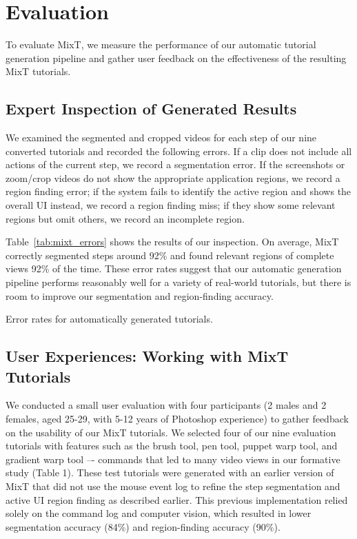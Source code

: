 \section{Evaluation}

To evaluate MixT, we measure the performance of our automatic tutorial generation pipeline and gather user feedback on the effectiveness of the resulting MixT tutorials.

\subsection{Expert Inspection of Generated Results}
We examined the segmented and cropped videos for each step of our nine converted tutorials and recorded the following errors. If a clip does not include all actions of the current step, we record a segmentation error. If the screenshots or zoom/crop videos do not show the appropriate application regions, we record a region finding error; if the system fails to identify the active region and shows the overall UI instead, we record a region finding miss; if they show some relevant regions but omit others, we record an incomplete region.

Table~\ref{tab:mixt_errors} shows the results of our inspection. On average, MixT correctly segmented steps around 92\% and found relevant regions of complete views 92\% of the time. These error rates suggest that our automatic generation pipeline performs reasonably well for a variety of real-world tutorials, but there is room to improve our segmentation and region-finding accuracy.

\begin{table}
  \centering
  \caption{Error rates for automatically generated tutorials.}
  \label{tab:mixt_errors}
\end{table}


\subsection{User Experiences: Working with MixT Tutorials}
We conducted a small user evaluation with four participants (2 males and 2 females, aged 25-29, with 5-12 years of Photoshop experience) to gather feedback on the usability of our MixT tutorials. We selected four of our nine evaluation tutorials with features such as the brush tool, pen tool, puppet warp tool, and gradient warp tool –- commands that led to many video views in our formative study (Table 1). These test tutorials were generated with an earlier version of MixT that did not use the mouse event log to refine the step segmentation and active UI region finding as described earlier. This previous implementation relied solely on the command log and computer vision, which resulted in lower segmentation accuracy (84\%) and region-finding accuracy (90\%).

